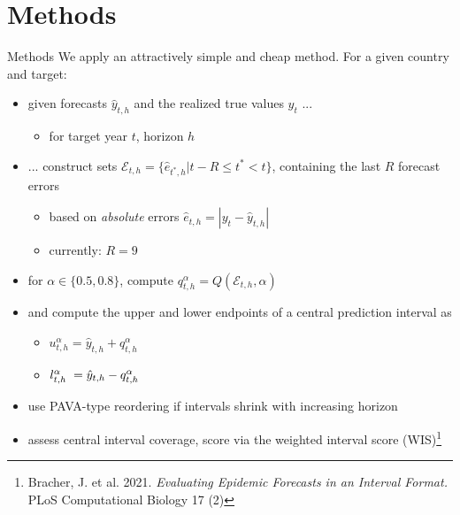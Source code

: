 \documentclass[en]{sdqbeamer}
\begin{document}
\section{Methods}
\begin{frame}{Methods}
We apply an attractively simple and cheap method. For a given country and target:
\begin{itemize}
    \item given forecasts $\hat{y}_{t, h}$ and the realized true values $y_{t}$ ...
    \begin{itemize}
        \item for target year $t$, horizon $h$
    \end{itemize}
    \item ... construct sets $\mathcal{E}_{t, h} = \{\hat{e}_{t^*, h}  | t-R \leq t^* < t \}$, containing the last $R$ forecast errors
    \begin{itemize}
        \item based on \textit{absolute} errors $\hat{e}_{t,h} = |y_{t} - \hat{y}_{t, h}| $
        \item currently: $R=9$
    \end{itemize}
    \item for $\alpha \in \{0.5, 0.8\}$, compute $q^{\alpha}_{t, h} =  Q\left(\mathcal{E}_{t, h}, \alpha \right)$
    \item and compute the upper and lower endpoints of a central prediction interval as 
    \begin{itemize}
        \item $u^{\alpha}_{t,h} = \hat{y}_{t, h} + q^{\alpha}_{t, h}$ 
        \item $l^{\alpha}_{t,h} \hspace{1mm} = \hat{y}_{t, h} - q^{\alpha}_{t, h}$
    \end{itemize}
    \item use PAVA-type reordering if intervals shrink with increasing horizon
    \item assess central interval coverage, score via the weighted interval score (WIS)\footnote{Bracher, J. et al. 2021. \textit{Evaluating
Epidemic Forecasts in an Interval Format.} PLoS Computational Biology 17 (2)}
\end{itemize}
    
\end{frame}
\end{document}
